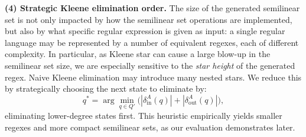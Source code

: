 

\medskip
\noindent
\textbf{(4) Strategic Kleene elimination order.}  
The size of the generated semilinear set is not only impacted by how the
	semilinear set operations are implemented, but also by what specific regular
	expression is given as input: a single regular language may be represented by a
	number of equivalent regexes, each of different complexity.
	In particular, as Kleene star can cause a large blow-up in the semilinear set size,
	we are especially sensitive to the \emph{star height} of the generated regex.
	Naive Kleene elimination may introduce many nested stars.  
	We reduce this by strategically choosing the next state to eliminate by:
	\[
	q^*=\arg\min_{q\in Q'}\bigl(|\delta^A_{\mathrm{in}}(q)|+|\delta^A_{\mathrm{out}}(q)|\bigr),
	\]
	eliminating lower-degree states first.  
	This heuristic empirically yields smaller regexes and more compact semilinear sets, as our evaluation demonstrates later.


